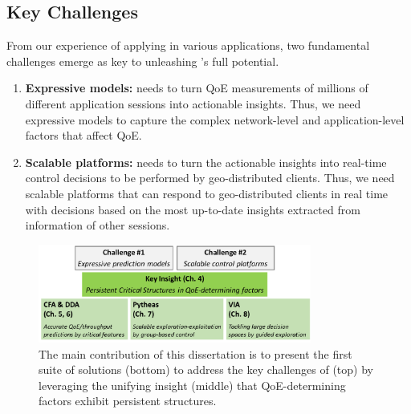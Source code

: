 \subsection{Key Challenges}
From our experience of applying \ddn in various applications, 
two fundamental challenges emerge as key to unleashing \ddn's full potential.

\begin{enumerate}

\item 
{\bf Expressive models:} 
\ddn needs to turn QoE measurements of millions of 
different application sessions into actionable insights.
Thus, we need expressive models to capture the complex network-level and 
application-level factors that affect QoE. 

\item 
{\bf Scalable platforms:}
\ddn needs to turn the actionable insights into 
real-time control decisions to be performed by
geo-distributed clients. 
Thus, we need scalable platforms that can respond to geo-distributed 
clients in real time with decisions based on the most up-to-date insights 
extracted from information of other sessions.

\end{enumerate}


\begin{figure}[t!]
\centering
\includegraphics[width=0.8\textwidth]{figures/intro-contribution.pdf}
\caption{The main contribution of this dissertation is to present the first suite of 
solutions (bottom) to address the key challenges of \ddn (top) by leveraging the 
unifying insight (middle) that QoE-determining factors exhibit persistent structures.}
\label{fig:intro-contribution}
\end{figure}


